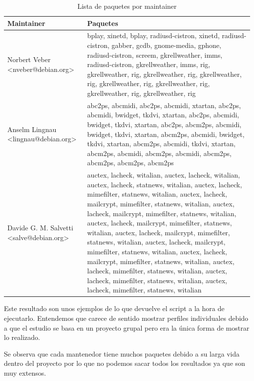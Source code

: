 \documentclass[a4paper, 12pt]{book}
\begin{document}
	
	\begin{table}[h!]
		\centering
		\begin{tabular}{|l|p{10cm}|}
			\hline
			\textbf{Maintainer} & \textbf{Paquetes} \\
			\hline
			Norbert Veber \textless{}nveber@debian.org\textgreater{} & bplay, xinetd, bplay, radiusd-cistron, xinetd, radiusd-cistron, gabber, gcdb, gnome-media, gphone, radiusd-cistron, screem, gkrellweather, imms, radiusd-cistron, gkrellweather, imms, rig, gkrellweather, rig, gkrellweather, rig, gkrellweather, rig, gkrellweather, rig, gkrellweather, rig, gkrellweather, rig, gkrellweather, rig \\
			\hline
			Anselm Lingnau \textless{}lingnau@debian.org\textgreater{} & abc2ps, abcmidi, abc2ps, abcmidi, xtartan, abc2ps, abcmidi, bwidget, tkdvi, xtartan, abc2ps, abcmidi, bwidget, tkdvi, xtartan, abc2ps, abcm2ps, abcmidi, bwidget, tkdvi, xtartan, abcm2ps, abcmidi, bwidget, tkdvi, xtartan, abcm2ps, abcmidi, tkdvi, xtartan, abcm2ps, abcmidi, abcm2ps, abcmidi, abcm2ps, abcm2ps, abcm2ps, abcm2ps \\
			\hline
			Davide G. M. Salvetti \textless{}salve@debian.org\textgreater{} & auctex, lacheck, witalian, auctex, lacheck, witalian, auctex, lacheck, statnews, witalian, auctex, lacheck, mimefilter, statnews, witalian, auctex, lacheck, mailcrypt, mimefilter, statnews, witalian, auctex, lacheck, mailcrypt, mimefilter, statnews, witalian, auctex, lacheck, mailcrypt, mimefilter, statnews, witalian, auctex, lacheck, mailcrypt, mimefilter, statnews, witalian, auctex, lacheck, mailcrypt, mimefilter, statnews, witalian, auctex, lacheck, mailcrypt, mimefilter, statnews, witalian, auctex, lacheck, mimefilter, statnews, witalian, auctex, lacheck, mimefilter, statnews, witalian, auctex, lacheck, mimefilter, statnews, witalian \\
			\hline
		\end{tabular}
		\caption{Lista de paquetes por maintainer}
	\end{table}

Este resultado son unos ejemplos de lo que devuelve el script a la hora de ejecutarlo. Entendemos que carece de sentido mostrar perfiles individuales debido a que el estudio se basa en un proyecto grupal pero era la única forma de mostrar lo realizado. 





Se observa que cada mantenedor tiene muchos paquetes debido a su larga vida dentro del proyecto por lo que no podemos sacar todos los resultados ya que son muy extensos.
\end{document}
